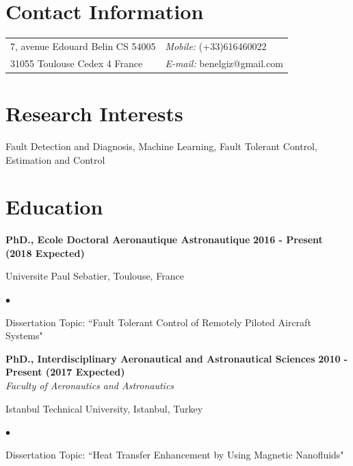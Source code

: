 \documentclass[margin,line]{res}
\newenvironment{list1}{
  \begin{list}{\ding{113}}{
      \setlength{\itemsep}{0in}
      \setlength{\parsep}{0in} \setlength{\parskip}{0in}
      \setlength{\topsep}{0in} \setlength{\partopsep}{0in}
      \setlength{\leftmargin}{0.17in}}}{\end{list}}
\newenvironment{list2}{
  \begin{list}{$\bullet$}{
      \setlength{\itemsep}{0in}
      \setlength{\parsep}{0in} \setlength{\parskip}{0in}
      \setlength{\topsep}{0in} \setlength{\partopsep}{0in}
      \setlength{\leftmargin}{0.2in}}}{\end{list}}
\begin{document}
\begin{resume}
\section{\sc Contact Information}
\vspace{.05in}
\begin{tabular}{@{}p{3in}p{3in}}
7, avenue Edouard Belin CS 54005 & {\it Mobile:}  (+33)616460022 \\
31055 Toulouse Cedex 4 France     & {\it E-mail:}  benelgiz@gmail.com\\
\end{tabular}


\section{\sc Research Interests} Fault Detection and Diagnosis, Machine Learning, Fault Tolerant Control, Estimation and Control

\section{\sc Education}

{\bf PhD., Ecole Doctoral Aeronautique Astronautique} \hfill {\bf  2016 - Present (2018 Expected)}\\
\vspace*{-.05in}
\begin{list1}
\item[] Universite Paul Sebatier, Toulouse, France
\begin{list2}
\vspace*{.05in}
\item Dissertation Topic:  ``Fault Tolerant Control of Remotely Piloted Aircraft Systems"
\end{list2}
\end{list1}

{\bf PhD., Interdisciplinary Aeronautical and Astronautical Sciences} \hfill {\bf  2010 - Present (2017 Expected)}\\
{\em Faculty of Aeronautics and Astronautics}
\vspace*{.1in}
\begin{list1}
\item[] Istanbul Technical University, Istanbul, Turkey
\begin{list2}
\vspace*{.05in}
\item Dissertation Topic:  ``Heat Transfer Enhancement by Using Magnetic Nanofluids"
\end{list2}
\end{list1}


\end{resume}
\end{document}

